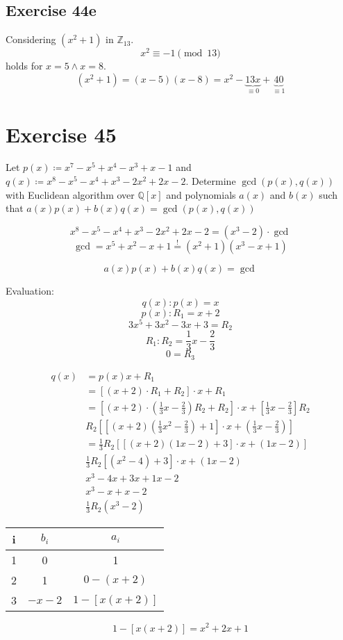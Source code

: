 \documentclass[a4paper]{article}
\theoremstyle{definition}
\begin{document}
\subsection{Exercise 44e}
Considering $(x^2+1)$ in $\mathbb Z_{13}$.
\[ x^2 \equiv -1 \pmod{13} \]
holds for $x = 5 \land x = 8$.
\[ (x^2 + 1) = (x - 5)(x - 8) = x^2 - \underbrace{13x}_{\equiv 0} + \underbrace{40}_{\equiv 1} \]

\section*{Exercise 45}
\begin{ex}
  Let $p(x) \coloneqq x^7 - x^5 + x^4 - x^3 + x - 1$ and $q(x) \coloneqq x^8 - x^5 - x^4 + x^3 - 2x^2 + 2x - 2$.
  Determine $\operatorname{gcd}(p(x), q(x))$ with Euclidean algorithm over $\mathbb Q[x]$ and polynomials $a(x)$ and $b(x)$ such that $a(x) p(x) + b(x) q(x) = \operatorname{gcd}(p(x), q(x))$
\end{ex}

\[ x^8 - x^5 - x^4 + x^3 - 2x^2 + 2x - 2 = (x^3 - 2) \cdot \operatorname{gcd} \]
\[ \operatorname{gcd} = x^5 + x^2 - x + 1 \overset!= (x^2 + 1)(x^3 - x + 1) \]

\[ a(x) p(x) + b(x) q(x) = \operatorname{gcd} \]

Evaluation:
\[ q(x) : p(x) = x \]
\[ p(x) : R_1 = x+2 \]
\[ 3x^5 + 3x^2 - 3x + 3 = R_2 \]
\[ R_1 : R_2 = \frac13 x - \frac23 \]
\[ 0 = R_3 \]

\begin{align*}
  q(x) &= p(x) x + R_1 \\
    &= \left[(x + 2) \cdot R_1 + R_2\right] \cdot x + R_1 \\
    &= \left[(x + 2) \cdot \left(\frac13 x - \frac23\right) R_2 + R_2\right] \cdot x + \left[\frac13 x - \frac23\right] R_2 \\
    &R_2\left[\left[(x + 2) \left(\frac13 x^2 - \frac23\right) + 1\right] \cdot x + \left(\frac13 x - \frac23\right)\right] \\
    &= \frac13 R_2 \left[\left[(x + 2) (1x - 2) + 3\right] \cdot x + (1x - 2)\right] \\
    &\frac13 R_2 [(x^2 - 4) + 3] \cdot x + (1x - 2) \\
    &x^3 - 4x + 3x + 1x - 2 \\
    &x^3 - x + x - 2 \\
    &\frac13 R_2(x^3 - 2)
\end{align*}

\begin{center}
  \begin{tabular}{ccc}
    i & $b_i$  & $a_i$ \\
  \hline
    1 & 0      & 1 \\
    2 & 1      & $0 - (x + 2)$ \\
    3 & $-x-2$ & $1 - [x (x + 2)]$
  \end{tabular}
\end{center}
\[ 1 - [x (x + 2)] = x^2 + 2x + 1 \]
\end{document}
